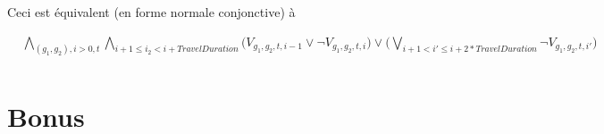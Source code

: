 \documentclass[a4paper]{article}
\begin{document}
Ceci est équivalent (en forme normale conjonctive) à

\begin{equation*}
    \begin{split}
      & \bigwedge_{(g_1, g_2), i > 0, t} 
        \bigwedge_{i+1\leq i_2<i+TravelDuration} 
        \big(  V_{g_1, g_2, t, i-1} \lor \neg V_{g_1, g_2, t, i}\big)
        \lor   
         \big( 
        \bigvee_{i + 1 < i' \leq i + 2 * TravelDuration} 
        \neg V_{g_1, g_2, t, i'} \big) \\
    \end{split}
\end{equation*}

\section{Bonus}
\end{document}
